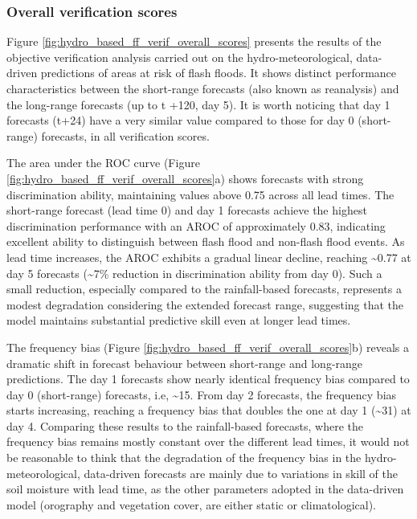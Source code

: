 \subsubsection{Overall verification scores}

Figure \ref{fig:hydro_based_ff_verif_overall_scores} presents the results of the objective verification analysis carried out on the hydro-meteorological, data-driven predictions of areas at risk of flash floods. It shows distinct performance characteristics between the short-range forecasts (also known as reanalysis) and the long-range forecasts (up to t +120, day 5). It is worth noticing that day 1 forecasts (t+24) have a very similar value compared to those for day 0 (short-range) forecasts, in all verification scores. 

The area under the ROC curve (Figure \ref{fig:hydro_based_ff_verif_overall_scores}a) shows forecasts with strong discrimination ability, maintaining values above 0.75 across all lead times. The short-range forecast (lead time 0) and day 1 forecasts achieve the highest discrimination performance with an AROC of approximately 0.83, indicating excellent ability to distinguish between flash flood and non-flash flood events. As lead time increases, the AROC exhibits a gradual linear decline, reaching \sim0.77 at day 5 forecasts (\sim7\% reduction in discrimination ability from day 0). Such a small reduction, especially compared to the rainfall-based forecasts, represents a modest degradation considering the extended forecast range, suggesting that the model maintains substantial predictive skill even at longer lead times.

The frequency bias (Figure \ref{fig:hydro_based_ff_verif_overall_scores}b) reveals a dramatic shift in forecast behaviour between short-range and long-range predictions. The day 1 forecasts show nearly identical frequency bias compared to day 0 (short-range) forecasts, i.e, \sim15. From day 2 forecasts, the frequency bias starts increasing, reaching a frequency bias that doubles the one at day 1 (\sim 31) at day 4. Comparing these results to the rainfall-based forecasts, where the frequency bias remains mostly constant over the different lead times, it would not be reasonable to think that the degradation of the frequency bias in the hydro-meteorological, data-driven forecasts are mainly due to variations in skill of the soil moisture with lead time, as the other parameters adopted in the data-driven model (orography and vegetation cover, are either static or climatological).

